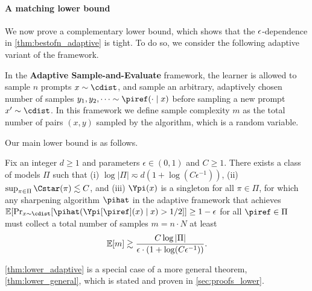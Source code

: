 \paragraph{A matching lower bound}
We now prove a complementary lower bound, which shows that the
$\epsilon$-dependence in \cref{thm:bestofn_adaptive} is tight. To do so,
we consider the following adaptive variant of the \framework framework.
\begin{definition}
  In the \textbf{Adaptive Sample-and-Evaluate} framework, the
  learner is allowed to sample $n$ prompts $x \sim \cdist$, and sample an
  arbitrary, adaptively chosen number of samples
  $y_1,y_2,\dots \sim \piref(\cdot \mid x)$ before sampling a new
  prompt $x' \sim \cdist$. In this framework we define sample
  complexity $m$ as the total number of pairs $(x,y)$ sampled by the
  algorithm, which is a random variable.
\end{definition}
Our main lower bound is as follows.
\begin{theorem}
  \label{thm:lower_adaptive}
  Fix an integer $d \ge 1$ and parameters $\epsilon \in (0,1)$ and $C
  \ge 1$. There exists a class of models $\Pi$ such that (i) $\log |\Pi|
  \eqsim d (1+\log(C \epsilon^{-1}))$, (ii) $\sup_{\pi \in \Pi}
  \Cstar(\pi) \lesssim C$, and (iii) $\Ypi(x)$ is a singleton for all
  $\pi\in\Pi$, for which any sharpening algorithm $\pihat$ in the
  adaptive \framework framework that
  achieves $\En\brk*{\Pr_{x \sim \cdist}[\pihat(\Ypi[\piref](x)\mid{}x) > 1/2]}  \ge 1
  - \epsilon$ for all $\piref \in \Pi$ must collect a total number of samples $m = n\cdot{}N$ at least
\begin{align}
  \operatorname{\mathbb{E}}[m]
  \gtrsim 
        \frac{ C\log |\Pi|}{\epsilon\cdot{}(1+\log(C
  \epsilon^{-1}))}.
\end{align}
\end{theorem}
\cref{thm:lower_adaptive} is a special case of a more general theorem, \cref{thm:lower_general}, which is stated and proven in \cref{sec:proofs_lower}.




